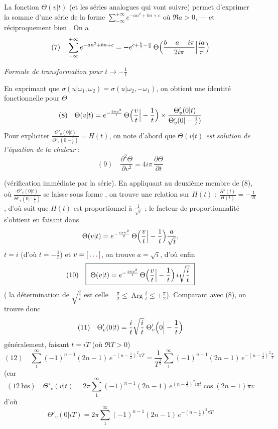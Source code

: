 \documentclass[11pt,a4paper]{article}
\begin{document}
La fonction $\Theta(v|t)$ (et les séries analogues qui vont suivre) permet
d'exprimer la somme d'une série de la forme
$\sum_{-\infty}^{+\infty} e^{-an^2+bn+c}$ où $\Re a > 0$, --- et
réciproquement bien . On a
\[
(7)\quad \sum_{-\infty}^{+\infty} e^{-an^2+bn+c} = -e^{c+\frac{b}{2}-\frac{a}{4}}\,
\Theta\Bigl(\frac{b-a-i\pi}{2i\pi}\Big|\frac{ia}{\pi}\Bigr)
\]

\emph{Formule de transformation pour $t\to -\frac{1}{t}$}

En exprimant que $\sigma(u|\omega_1,\omega_2) = \sigma(u|\omega_2,-\omega_1)$, on
obtient une identité fonctionnelle pour $\Theta$
\[
(8)\quad \Theta(v|t) = e^{-\frac{i\pi v^2}{t}}\,
\Theta\Bigl(\frac{v}{t}\Big|-\frac{1}{t}\Bigr) \times
\frac{\Theta'_v(0|t)}{\Theta'_v(0|-\frac{1}{t})}
\]
Pour expliciter $\frac{\Theta'_v(0|t)}{\Theta'_v(0|-\frac1t)} = H(t)$, on note
d'abord que \emph{$\Theta(v|t)$ est solution de l'équation de la chaleur} :
\[
(9)\quad \frac{\partial^2\Theta}{\partial v^2} = 4i\pi\,\frac{\partial\Theta}{\partial t}
\]

(vérification immédiate par la série). En appliquant au deuxième membre de
(8), où $\frac{\Theta'_v(0|t)}{\Theta'_v(0|-\frac1t)}$ se laisse sous forme
, on trouve une relation sur $H(t)$ :
$\frac{H'(t)}{H(t)} = -\frac{1}{2t}$, d'où suit que $H(t)$ est proportionnel à
$\frac{1}{\sqrt t}$ ; le facteur de proportionnalité s'obtient en faisant
dans
\[
\Theta(v|t) = e^{-\frac{i\pi v^2}{t}}\,\Theta\Bigl(\frac{v}{t}\Big|-\frac{1}{t}\Bigr)\frac{a}{\sqrt t},
\]
$t = i$ (d'où $t = -\frac{1}{t}$) et $v = \ill{}$, on trouve $a = \sqrt i$,
d'où enfin
\[
(10)\quad \boxed{\ \Theta(v|t) = e^{-\frac{i\pi v^2}{t}}\,
\Theta\Bigl(\frac{v}{t}\Big|-\frac{1}{t}\Bigr)\, i\sqrt{\frac{i}{t}}\ }
\]
( la détermination de $\sqrt{\frac{i}{t}}$ est celle
$-\frac{\pi}{2}\leq\operatorname{Arg}\frac{i}{t}\leq+\frac{\pi}{2}$).
Comparant avec (8), on trouve donc
\[
(11)\quad \Theta'_v(0|t) = \frac{i}{t}\sqrt{\frac{i}{t}}\;\Theta'_v\Bigl(0\Big|-\frac{1}{t}\Bigr)
\]
 généralement, faisant $t = iT$ (où $\Re T > 0$)
\[
(12)\quad \sum_{1}^{\infty}(-1)^{n-1}(2n-1)\,e^{-(n-\frac12)^2\pi T}
= \frac{1}{T^{\frac32}}\sum_{1}^{\infty}(-1)^{n-1}(2n-1)\,e^{-(n-\frac12)^2\frac{\pi}{T}}
\]
(car
\[
(12\ \mathrm{bis})\quad \Theta'_v(v|t) = 2\pi\sum_{1}^{\infty}(-1)^{n-1}(2n-1)\,
e^{(n-\frac12)^2 i\pi t}\cos(2n-1)\pi v
\]
d'où
\[
\Theta'_v(0|iT) = 2\pi\sum_{1}^{\infty}(-1)^{n-1}(2n-1)\,e^{-(n-\frac12)^2\pi T}
\]
\end{document}
